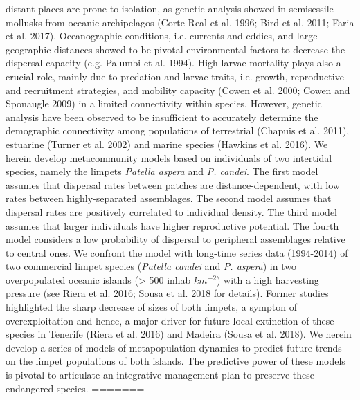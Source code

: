 \documentclass[12pt]{article}
\begin{document}
\begin{flushleft}
{{{{{distant places are prone to isolation, as genetic analysis showed in
semisessile mollusks from oceanic archipelagos (Corte-Real et
al. 1996; Bird et al. 2011; Faria et al. 2017). Oceanographic
conditions, i.e. currents and eddies, and large geographic distances
showed to be pivotal environmental factors to decrease the dispersal
capacity (e.g. Palumbi et al. 1994). High larvae mortality plays also
a crucial role, mainly due to predation and larvae traits,
i.e. growth, reproductive and recruitment strategies, and mobility
capacity (Cowen et al. 2000; Cowen and Sponaugle 2009) in a limited
connectivity within species. However, genetic analysis have been
observed to be insufficient to accurately determine the demographic
connectivity among populations of terrestrial (Chapuis et al. 2011),
estuarine (Turner et al. 2002) and marine species (Hawkins et
al. 2016).  We herein develop metacommunity models based on
individuals of two intertidal species, namely the limpets
\textit{Patella aspera} and \textit{P. candei}. The first model
assumes that dispersal rates between patches are distance-dependent,
with low rates between highly-separated assemblages. The second model
assumes that dispersal rates are positively correlated to individual
density. The third model assumes that larger individuals have higher
reproductive potential. The fourth model considers a low probability
of dispersal to peripheral assemblages relative to central ones. We
confront the model with long-time series data (1994-2014) of two
commercial limpet species (\textit{Patella candei} and
\textit{P. aspera}) in two overpopulated oceanic islands (> 500 inhab
$km^{-2}$) with a high harvesting pressure (see Riera et al. 2016; Sousa
et al. 2018 for details). Former studies highlighted the sharp
decrease of sizes of both limpets, a sympton of overexploitation and
hence, a major driver for future local extinction of these species in
Tenerife (Riera et al. 2016) and Madeira (Sousa et al. 2018). We
herein develop a series of models of metapopulation dynamics to
predict future trends on the limpet populations of both islands. The
predictive power of these models is pivotal to articulate an
integrative management plan to preserve these endangered species.
=======
}}}}}
\end{flushleft}
\end{document}
